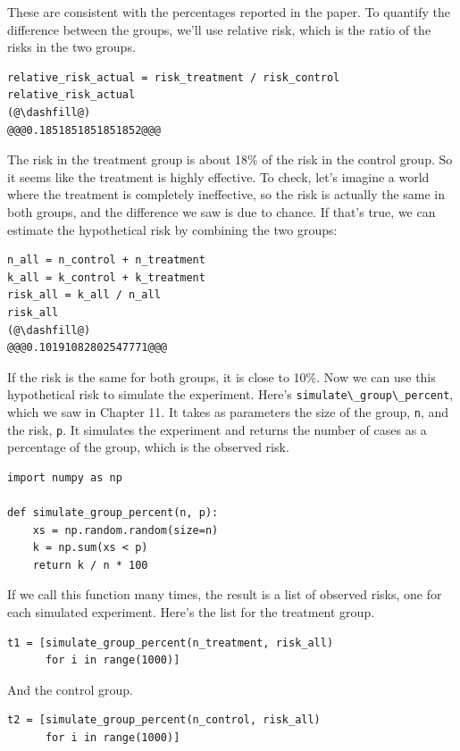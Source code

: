 These are consistent with the percentages reported in the paper. To
quantify the difference between the groups, we'll use relative risk,
which is the ratio of the risks in the two groups.

\begin{lstlisting}[]
relative_risk_actual = risk_treatment / risk_control
relative_risk_actual
(@\dashfill@)
@@@0.1851851851851852@@@
\end{lstlisting}

The risk in the treatment group is about 18\% of the risk in the control
group. So it seems like the treatment is highly effective. To check,
let's imagine a world where the treatment is completely ineffective, so
the risk is actually the same in both groups, and the difference we saw
is due to chance. If that's true, we can estimate the hypothetical risk
by combining the two groups:

\begin{lstlisting}[]
n_all = n_control + n_treatment
k_all = k_control + k_treatment
risk_all = k_all / n_all
risk_all
(@\dashfill@)
@@@0.10191082802547771@@@
\end{lstlisting}

If the risk is the same for both groups, it is close to 10\%. Now we can
use this hypothetical risk to simulate the experiment. Here's
\passthrough{\lstinline!simulate\_group\_percent!}, which we saw in
Chapter 11. It takes as parameters the size of the group,
\passthrough{\lstinline!n!}, and the risk, \passthrough{\lstinline!p!}.
It simulates the experiment and returns the number of cases as a
percentage of the group, which is the observed risk.

\begin{lstlisting}[]
import numpy as np

def simulate_group_percent(n, p):
    xs = np.random.random(size=n)
    k = np.sum(xs < p)
    return k / n * 100
\end{lstlisting}

If we call this function many times, the result is a list of observed
risks, one for each simulated experiment. Here's the list for the
treatment group.

\begin{lstlisting}[]
t1 = [simulate_group_percent(n_treatment, risk_all)
      for i in range(1000)]
\end{lstlisting}

And the control group.

\begin{lstlisting}[]
t2 = [simulate_group_percent(n_control, risk_all)
      for i in range(1000)]
\end{lstlisting}

